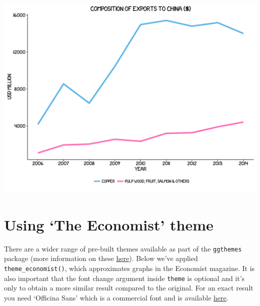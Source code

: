 \begin{Shaded}
\begin{Highlighting}[]
\StringTok{        } \NormalTok{(),}
\StringTok{        } \NormalTok{(), } \NormalTok{(), }
\StringTok{        } \NormalTok{(),}
\StringTok{        }\NormalTok{(}\NormalTok{), }
\StringTok{        }\NormalTok{(}\NormalTok{)) }
\end{Highlighting}
\end{Shaded}

\begin{center}\includegraphics[width=0.55\linewidth]{figures/line_8-1} \end{center}

\section{\texorpdfstring{Using `The Economist'
theme}{Using The Economist theme}}\label{using-the-economist-theme}

There are a wider range of pre-built themes available as part of the
\texttt{ggthemes} package (more information on these
\href{https://cran.r-project.org/web/packages/ggthemes/vignettes/ggthemes.html}{here}).
Below we've applied \texttt{theme\_economist()}, which approximates
graphs in the Economist magazine. It is also important that the font
change argument inside \texttt{theme} is optional and it's only to
obtain a more similar result compared to the original. For an exact
result you need `Officina Sans' which is a commercial font and is
available \href{http://www.myfonts.com/fonts/itc/officina-sans/}{here}.

